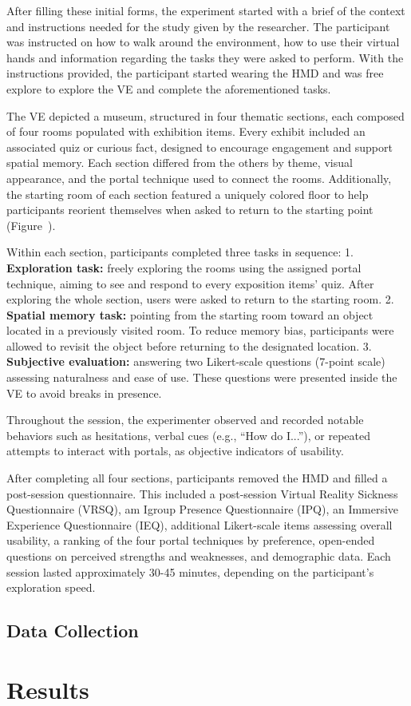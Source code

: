 After filling these initial forms, the experiment started with a brief of the context and instructions needed for the study given by the 
researcher. The participant was instructed on how to walk around the environment, how to use their virtual hands and 
information regarding the tasks they were asked to perform.  With the instructions provided, the participant started wearing the 
\gls{HMD} and was free explore to explore the \gls{VE} and complete the aforementioned tasks.

The \gls{VE} depicted a museum, structured in four thematic sections, each composed of four rooms populated with exhibition items. Every 
exhibit included an associated quiz or curious fact, designed to encourage engagement and support spatial memory. Each section differed 
from the others by theme, visual appearance, and the portal technique used to connect the rooms. Additionally, the starting room of each 
section featured a uniquely colored floor to help participants reorient themselves when asked to return to the starting point 
(Figure~).

Within each section, participants completed three tasks in sequence:  
1. \textbf{Exploration task:} freely exploring the rooms using the assigned portal technique, aiming to see and respond to every exposition items' quiz. After exploring the whole section, users were asked to return to the starting room.  
2. \textbf{Spatial memory task:} pointing from the starting room toward an object located in a previously visited room. To reduce memory bias, participants were allowed to revisit the object before returning to the designated location.  
3. \textbf{Subjective evaluation:} answering two Likert-scale questions (7-point scale) assessing naturalness and ease of use. These questions were presented inside the \gls{VE} to avoid breaks in presence.  

Throughout the session, the experimenter observed and recorded notable behaviors such as hesitations, verbal cues (e.g., “How do I...”), 
or repeated attempts to interact with portals, as objective indicators of usability.  

After completing all four sections, participants removed the \gls{HMD} and filled a post-session questionnaire. This included a post-session 
Virtual Reality Sickness Questionnaire (VRSQ), am Igroup Presence Questionnaire (IPQ), an Immersive Experience Questionnaire (IEQ), 
additional Likert-scale items assessing overall usability, a ranking of the four portal techniques by preference, open-ended questions on perceived 
strengths and weaknesses, and demographic data. Each session lasted approximately 30-45 minutes, depending on the participant's exploration speed.


\subsection{Data Collection}
\label{sec:data}



\section{Results}
\label{sec:results}

